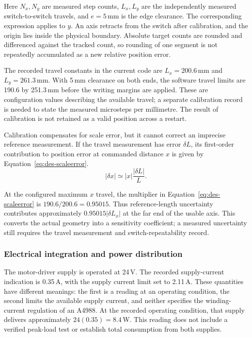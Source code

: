 Here $N_x,N_y$ are measured step counts, $L_x,L_y$ are the independently measured switch-to-switch travels, and $e=5$\,mm is the edge clearance. The corresponding expression applies to $y$. An axis retracts from the switch after calibration, and the origin lies inside the physical boundary. Absolute target counts are rounded and differenced against the tracked count, so rounding of one segment is not repeatedly accumulated as a new relative position error.

The recorded travel constants in the current code are $L_x=200.6$\,mm and $L_y=261.3$\,mm. With 5\,mm clearance on both ends, the software travel limits are 190.6 by 251.3\,mm before the writing margins are applied. These are configuration values describing the available travel; a separate calibration record is needed to state the measured microsteps per millimetre. The result of calibration is not retained as a valid position across a restart.

Calibration compensates for scale error, but it cannot correct an imprecise reference measurement. If the travel measurement has error $\delta L$, its first-order contribution to position error at commanded distance $x$ is given by Equation~\ref{eq:des-scaleerror}.
\begin{equation}
|\delta x|\simeq |x|\frac{|\delta L|}{L}.
\label{eq:des-scaleerror}
\end{equation}

At the configured maximum $x$ travel, the multiplier in Equation~\ref{eq:des-scaleerror} is $190.6/200.6=0.95015$. Thus reference-length uncertainty contributes approximately $0.95015|\delta L_x|$ at the far end of the usable axis. This converts the actual geometry into a sensitivity coefficient; a measured uncertainty still requires the travel measurement and switch-repeatability record.

\subsubsection{Electrical integration and power distribution}
\label{sec:des-power}
The motor-driver supply is operated at 24\,V. The recorded supply-current indication is 0.35\,A, with the supply current limit set to 2.11\,A. These quantities have different meanings: the first is a reading at an operating condition, the second limits the available supply current, and neither specifies the winding-current regulation of an A4988. At the recorded operating condition, that supply delivers approximately $24(0.35)=8.4$\,W. This reading does not include a verified peak-load test or establish total consumption from both supplies.

